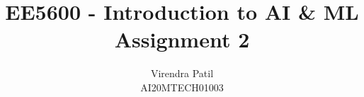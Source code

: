 \documentclass[journal,12pt]{IEEEtran}
\begin{document}
%


\newtheorem{theorem}{Theorem}[section]
\newtheorem{problem}{Problem}
\newtheorem{proposition}{Proposition}[section]
\newtheorem{lemma}{Lemma}[section]
\newtheorem{corollary}[theorem]{Corollary}
\newtheorem{example}{Example}[section]
\newtheorem{definition}[problem]{Definition}
\newcommand{\BEQA}{\begin{eqnarray}}
\newcommand{\EEQA}{\end{eqnarray}}
\newcommand{\define}{\stackrel{\triangle}{=}}

\providecommand{\mbf}{\mathbf}
\providecommand{\pr}[1]{\ensuremath{\Pr\left(#1\right)}}
\providecommand{\qfunc}[1]{\ensuremath{Q\left(#1\right)}}
\providecommand{\sbrak}[1]{\ensuremath{{}\left[#1\right]}}
\providecommand{\lsbrak}[1]{\ensuremath{{}\left[#1\right.}}
\providecommand{\rsbrak}[1]{\ensuremath{{}\left.#1\right]}}
\providecommand{\brak}[1]{\ensuremath{\left(#1\right)}}
\providecommand{\lbrak}[1]{\ensuremath{\left(#1\right.}}
\providecommand{\rbrak}[1]{\ensuremath{\left.#1\right)}}
\providecommand{\cbrak}[1]{\ensuremath{\left\{#1\right\}}}
\providecommand{\lcbrak}[1]{\ensuremath{\left\{#1\right.}}
\providecommand{\rcbrak}[1]{\ensuremath{\left.#1\right\}}}
\theoremstyle{remark}
\newtheorem{rem}{Remark}
\newcommand{\sgn}{\mathop{\mathrm{sgn}}}
\providecommand{\abs}[1]{\left\vert#1\right\vert}
\providecommand{\res}[1]{\Res\displaylimits_{#1}} 
\providecommand{\norm}[1]{\left\lVert#1\right\rVert}
\providecommand{\mtx}[1]{\mathbf{#1}}
\providecommand{\mean}[1]{E\left[ #1 \right]}
\providecommand{\fourier}{\overset{\mathcal{F}}{ \rightleftharpoons}}
\providecommand{\system}{\overset{\mathcal{H}}{ \longleftrightarrow}}
\newcommand{\solution}{\noindent \textbf{Solution: }}
\newcommand{\cosec}{\,\text{cosec}\,}
\providecommand{\dec}[2]{\ensuremath{\overset{#1}{\underset{#2}{\gtrless}}}}
\newcommand{\myvec}[1]{\ensuremath{\begin{pmatrix}#1\end{pmatrix}}}
\newcommand{\cmyvec}[1]{\ensuremath{\begin{pmatrix*}[c]#1\end{pmatrix*}}}
\newcommand{\mydet}[1]{\ensuremath{\begin{vmatrix}#1\end{vmatrix}}}
\newcommand{\proj}[2]{\textbf{proj}_{\vec{#1}}\vec{#2}}
\let\StandardTheFigure\thefigure
\let\vec\mathbf
\title{EE5600 - Introduction to AI \& ML\\Assignment 2}
\author{Virendra Patil\\AI20MTECH01003}	
\maketitle
\end{document}
